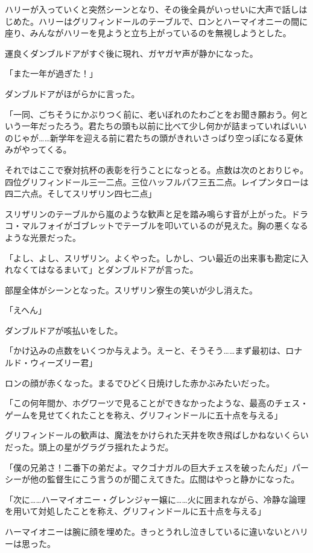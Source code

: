 \documentclass[10pt,a4paper]{article}
\begin{document}
\begin{CJK}{UTF8}{min}
ハリーが入っていくと突然シーンとなり、その後全員がいっせいに大声で話しはじめた。ハリーはグリフィンドールのテーブルで、ロンとハーマイオニーの間に座り、みんながハリーを見ようと立ち上がっているのを無視しようとした。

運良くダンブルドアがすぐ後に現れ、ガヤガヤ声が静かになった。

「また一年が過ぎた！」

ダンブルドアがほがらかに言った。

「一同、ごちそうにかぶりつく前に、老いぼれのたわごとをお聞き願おう。何という一年だったろう。君たちの頭も以前に比べて少し何かが詰まっていればいいのじゃが……新学年を迎える前に君たちの頭がきれいさっぱり空っぽになる夏休みがやってくる。

それではここで寮対抗杯の表彰を行うことになっとる。点数は次のとおりじゃ。四位グリフィンドール三一二点。三位ハッフルパフ三五二点。レイプンタローは四二六点。そしてスリザリン四七二点」

スリザリンのテーブルから嵐のような歓声と足を踏み鳴らす音が上がった。ドラコ・マルフォイがゴブレットでテーブルを叩いているのが見えた。胸の悪くなるような光景だった。

「よし、よし、スリザリン。よくやった。しかし、つい最近の出来事も勘定に入れなくてはなるまいて」とダンブルドアが言った。

部屋全体がシーンとなった。スリザリン寮生の笑いが少し消えた。

「えへん」

ダンブルドアが咳払いをした。

「かけ込みの点数をいくつか与えよう。えーと、そうそう……まず最初は、ロナルド・ウィーズリー君」

ロンの顔が赤くなった。まるでひどく日焼けした赤かぶみたいだった。

「この何年間か、ホグワーツで見ることができなかったような、最高のチェス・ゲームを見せてくれたことを称え、グリフィンドールに五十点を与える」

グリフィンドールの歓声は、魔法をかけられた天井を吹き飛ばしかねないくらいだった。頭上の星がグラグラ揺れたようだ。

「僕の兄弟さ！二番下の弟だよ。マクゴナガルの巨大チェスを破ったんだ」パーシーが他の監督生にこう言うのが聞こえてきた。広間はやっと静かになった。

「次に……ハーマイオニー・グレンジャー嬢に……火に囲まれながら、冷静な論理を用いて対処したことを称え、グリフィンドールに五十点を与える」

ハーマイオニーは腕に顔を埋めた。きっとうれし泣きしているに違いないとハリーは思った。


\end{CJK}
\end{document}
